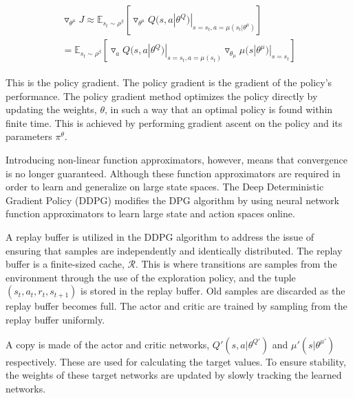 \documentclass[conference]{IEEEtran}
\begin{document}
\begin{align}
\begin{split}
	\triangledown_{\theta^\mu}J\approx\mathbb{E}_{s_t\sim\rho^\beta}[\triangledown_{\theta^\mu}Q(s,a|\theta^Q)|_{s=s_t,a=\mu(s_t|\theta^\mu)}] \\
	= \mathbb{E}_{s_t\sim\rho^\beta}[\triangledown_aQ(s,a|\theta^Q)|_{s=s_t,a=\mu(s_t)}\triangledown_{\theta_\mu}\mu(s|\theta^\mu)|_{s=s_t}]
\end{split}
\end{align}
  
This is the policy gradient. The policy gradient is the gradient of the policy's performance. The policy gradient method optimizes the policy directly by updating the weights, $\theta$, in such a way that an optimal policy is found within finite time. This is achieved by performing gradient ascent on the policy and its parameters $\pi^\theta$.

Introducing non-linear function approximators, however, means that convergence is no longer guaranteed. Although these function approximators are required in order to learn and generalize on large state spaces. The Deep Deterministic Gradient Policy (DDPG) modifies the DPG algorithm by using neural network function approximators to learn large state and action spaces online.

A replay buffer is utilized in the DDPG algorithm to address the issue of ensuring that samples are independently and identically distributed. The replay buffer is a finite-sized cache, $\mathcal{R}$. This is where transitions are samples from the environment through the use of the exploration policy, and the tuple $(s_t,a_t,r_t,s_{t+1})$ is stored in the replay buffer. Old samples are discarded as the replay buffer becomes full. The actor and critic are trained by sampling from the replay buffer uniformly. 

A copy is made of the actor and critic networks, $Q'(s,a|\theta^{Q'})$ and $\mu'(s|\theta^{\mu'})$ respectively. These are used for calculating the target values. To ensure stability, the weights of these target networks are updated by slowly tracking the learned networks.
\end{document}
